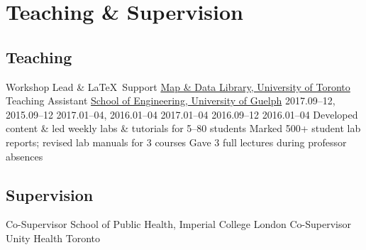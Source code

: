 \section{Teaching \& Supervision}\twodate
\subsection{Teaching}
  {Workshop Lead \& \LaTeX\ Support}
  {\href{https://mdl.library.utoronto.ca}{Map \& Data Library, University of Toronto}}
  {Teaching Assistant}
  {\href{https://www.uoguelph.ca/engineering}{School of Engineering, University of Guelph}}
     {2017.09--12, 2015.09--12}
       {2017.01--04, 2016.01--04}
     {2017.01--04}
              {2016.09--12}
   {2016.01--04}
  \bullet Developed content \& led weekly labs \& tutorials for 5--80 students
  \bullet Marked 500+ student lab reports; revised lab manuals for 3 courses
  \bullet Gave 3 full lectures during professor absences
\clearpage %
\subsection{Supervision}
  {Co-Supervisor}
  {School of Public Health, Imperial College London}
  {Co-Supervisor}
  {Unity Health Toronto}
\vspace{1em} %
